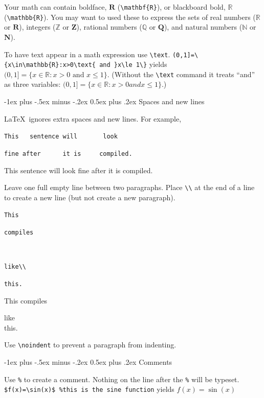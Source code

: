 \documentclass[a4paper,10pt]{article}
\makeatletter
\renewcommand{\section}{\@startsection{section}{1}{0mm}%
                                {-1ex plus -.5ex minus -.2ex}%
                                {0.5ex plus .2ex}%
                                {\normalfont\large\bfseries}}
\makeatother
\begin{document}
\begin{multicols}{3}
    Your math can contain boldface, $\mathbf{R}$ (\verb!\mathbf{R}!), or blackboard bold, $\mathbb{R}$ (\verb!\mathbb{R}!). You may want to used these to express the sets of real numbers ($\mathbb{R}$ or $\mathbf{R}$), integers ($\mathbb{Z}$ or $\mathbf{Z}$), rational numbers ($\mathbb{Q}$ or $\mathbf{Q}$), and natural numbers ($\mathbb{N}$ or $\mathbf{N}$).

    To have text appear in a math expression use \verb!\text!. \verb!(0,1]=\{x\in\mathbb{R}:x>0\text{ and }x\le 1\}! yields $(0,1]=\{x\in\mathbb{R}:x>0\text{ and }x\le 1\}$. (Without the \verb!\text! command it treats ``and'' as three variables: $(0,1]=\{x\in\mathbb{R}:x>0 and x\le 1\}$.)



    \section{Spaces and new lines}

    \LaTeX\ ignores extra spaces and new lines. For example,

    \verb!This   sentence will       look!

    \verb!fine after      it is     compiled.!

    This   sentence will       look
    fine after      it is     compiled.


    Leave one full empty line between two paragraphs. Place \verb!\\! at the end of a line to create a new line (but not create a new paragraph).

    \verb!This!

    \verb!compiles!

    ~

    \verb!like\\!

    \verb!this.!

    This
    compiles

    like\\
    this.

    Use  \verb!\noindent! to prevent a paragraph from indenting.

    \section{Comments}

    Use \verb!%! to create a comment. Nothing on the line after the \verb!%! will be typeset. \verb!$f(x)=\sin(x)$ %this is the sine function! yields $f(x)=\sin(x)$%


\end{multicols}
\end{document}
